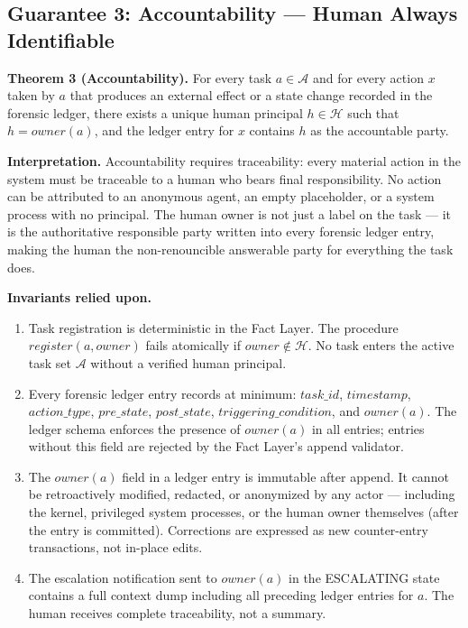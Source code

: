 \subsection{Guarantee 3: Accountability — Human Always Identifiable}
\label{sec:accountability}

\textbf{Theorem 3 (Accountability).} For every task $a \in \mathcal{A}$ and for every action $x$ taken by $a$ that produces an external effect or a state change recorded in the forensic ledger, there exists a unique human principal $h \in \mathcal{H}$ such that $h = owner(a)$, and the ledger entry for $x$ contains $h$ as the accountable party.

\bigskip
\noindent\textbf{Interpretation.} Accountability requires traceability: every material action in the system must be traceable to a human who bears final responsibility. No action can be attributed to an anonymous agent, an empty placeholder, or a system process with no principal. The human owner is not just a label on the task — it is the authoritative responsible party written into every forensic ledger entry, making the human the non-renouncible answerable party for everything the task does.

\bigskip
\noindent\textbf{Invariants relied upon.}

\begin{enumerate}
\item[\textbf{I8}] Task registration is deterministic in the Fact Layer. The procedure $register(a, owner)$ fails atomically if $owner \notin \mathcal{H}$. No task enters the active task set $\mathcal{A}$ without a verified human principal.
\item[\textbf{I9}] Every forensic ledger entry records at minimum: $task\_id$, $timestamp$, $action\_type$, $pre\_state$, $post\_state$, $triggering\_condition$, and $owner(a)$. The ledger schema enforces the presence of $owner(a)$ in all entries; entries without this field are rejected by the Fact Layer's append validator.
\item[\textbf{I10}] The $owner(a)$ field in a ledger entry is immutable after append. It cannot be retroactively modified, redacted, or anonymized by any actor — including the kernel, privileged system processes, or the human owner themselves (after the entry is committed). Corrections are expressed as new counter-entry transactions, not in-place edits.
\item[\textbf{I11}] The escalation notification sent to $owner(a)$ in the ESCALATING state contains a full context dump including all preceding ledger entries for $a$. The human receives complete traceability, not a summary.
\end{enumerate}

